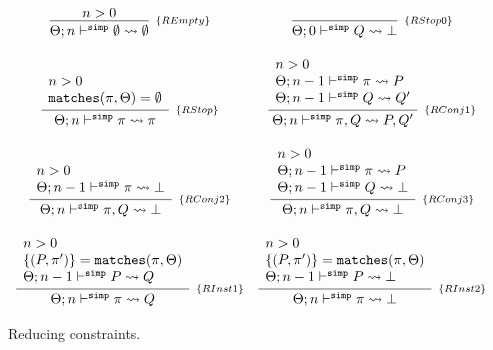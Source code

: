 \documentclass[a4paper, 11pt]{article}
\begin{document}
\begin{figure}[H] 
  \[
    \begin{array}{cc}
      \infer[_{\{REmpty\}}]
            {\Theta ; n \simp \emptyset \leadsto \emptyset}
            {n > 0}
      & 
      \infer[_{\{RStop0\}}] 
            {\Theta ; 0 \simp Q \leadsto \bot} 
            {} 
      \\ \\ 
      \infer[_{\{RStop\}}]
            {\Theta ; n \simp \pi \leadsto \pi} 
            {\begin{array}{l}
              n > 0 \\
              \mathtt{matches}(\pi,\Theta) = \emptyset
             \end{array}}
      & 
      \infer[_{\{RConj1\}}]
            {\Theta ; n \simp \pi, Q \leadsto P, Q'}
            {\begin{array}{l}
              n > 0 \\ 
              \Theta ; n - 1 \simp \pi \leadsto P \\ 
              \Theta ; n - 1 \simp Q \leadsto Q'
             \end{array}}
      \\ \\ 
      \infer[_{\{RConj2\}}]
            {\Theta ; n \simp \pi, Q \leadsto \bot}
            {\begin{array}{l}
              n > 0 \\ 
              \Theta ; n - 1 \simp \pi \leadsto \bot \\ 
             \end{array}}
      & 
      \infer[_{\{RConj3\}}]
            {\Theta ; n \simp \pi, Q \leadsto \bot}
            {\begin{array}{l}
              n > 0 \\ 
              \Theta ; n - 1 \simp \pi \leadsto P \\ 
              \Theta ; n - 1 \simp Q \leadsto \bot 
             \end{array}}
      \\ \\
      \infer[_{\{RInst1\}}]
            {\Theta ; n \simp \pi \leadsto Q}
            {\begin{array}{l}
              n > 0 \\ 
              \{(P,\pi')\} = \mathtt{matches}(\pi,\Theta)\\
              \Theta;n - 1 \simp P \leadsto Q
             \end{array}}
      &
      \infer[_{\{RInst2\}}]
            {\Theta ; n \simp \pi \leadsto \bot}
            {\begin{array}{l}
              n > 0 \\ 
              \{(P,\pi')\} = \mathtt{matches}(\pi,\Theta)\\
              \Theta;n - 1 \simp P \leadsto \bot
             \end{array}}

    \end{array}
  \]
  \centering
  \caption{Reducing constraints.}
  \label{fig:reduce-constraints}
\end{figure}
\end{document}
